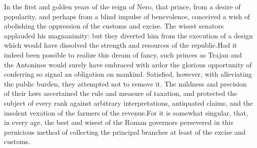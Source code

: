 



In the first and golden years of the reign of Nero, that prince,
from a desire of popularity, and perhaps from a blind impulse of
benevolence, conceived a wish of abolishing the oppression of the
customs and excise. The wisest senators applauded his
magnanimity: but they diverted him from the execution of a design
which would have dissolved the strength and resources of the
republic.\footnotemark[110] Had it indeed been possible to realize this dream
of fancy, such princes as Trajan and the Antonines would surely
have embraced with ardor the glorious opportunity of conferring
so signal an obligation on mankind. Satisfied, however, with
alleviating the public burden, they attempted not to remove it.
The mildness and precision of their laws ascertained the rule and
measure of taxation, and protected the subject of every rank
against arbitrary interpretations, antiquated claims, and the
insolent vexation of the farmers of the revenue.\footnotemark[111] For it is
somewhat singular, that, in every age, the best and wisest of the
Roman governors persevered in this pernicious method of
collecting the principal branches at least of the excise and
customs.\footnotemark[112]




